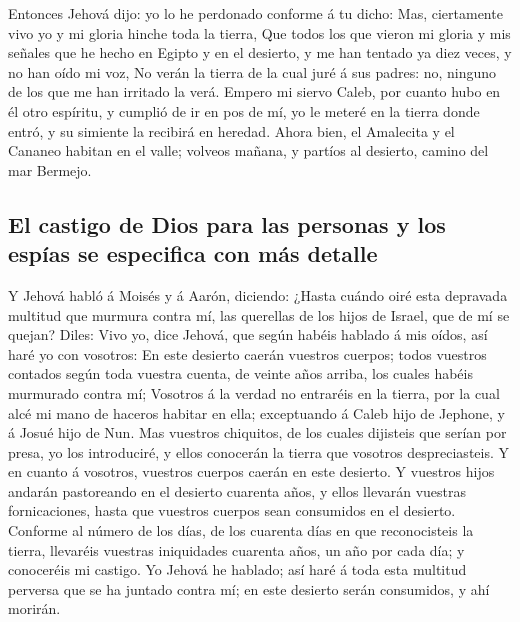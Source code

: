  Entonces Jehová dijo: yo lo he perdonado conforme á tu
dicho:  Mas, ciertamente vivo yo y mi gloria hinche toda la
tierra,  Que todos los que vieron mi gloria y mis señales
que he hecho en Egipto y en el desierto, y me han tentado ya diez veces,
y no han oído mi voz,  No verán la tierra de la cual juré á
sus padres: no, ninguno de los que me han irritado la verá.
 Empero mi siervo Caleb, por cuanto hubo en él otro
espíritu, y cumplió de ir en pos de mí, yo le meteré en la tierra donde
entró, y su simiente la recibirá en heredad.  Ahora bien,
el Amalecita y el Cananeo habitan en el valle; volveos mañana, y partíos
al desierto, camino del mar Bermejo.

\hypertarget{el-castigo-de-dios-para-las-personas-y-los-espuxedas-se-especifica-con-muxe1s-detalle}{%
\subsection{El castigo de Dios para las personas y los espías se
especifica con más
detalle}\label{el-castigo-de-dios-para-las-personas-y-los-espuxedas-se-especifica-con-muxe1s-detalle}}

 Y Jehová habló á Moisés y á Aarón, diciendo: 
¿Hasta cuándo oiré esta depravada multitud que murmura contra mí, las
querellas de los hijos de Israel, que de mí se quejan? 
Diles: Vivo yo, dice Jehová, que según habéis hablado á mis oídos, así
haré yo con vosotros:  En este desierto caerán vuestros
cuerpos; todos vuestros contados según toda vuestra cuenta, de veinte
años arriba, los cuales habéis murmurado contra mí; 
Vosotros á la verdad no entraréis en la tierra, por la cual alcé mi mano
de haceros habitar en ella; exceptuando á Caleb hijo de Jephone, y á
Josué hijo de Nun.  Mas vuestros chiquitos, de los cuales
dijisteis que serían por presa, yo los introduciré, y ellos conocerán la
tierra que vosotros despreciasteis.  Y en cuanto á
vosotros, vuestros cuerpos caerán en este desierto.  Y
vuestros hijos andarán pastoreando en el desierto cuarenta años, y ellos
llevarán vuestras fornicaciones, hasta que vuestros cuerpos sean
consumidos en el desierto.  Conforme al número de los días,
de los cuarenta días en que reconocisteis la tierra, llevaréis vuestras
iniquidades cuarenta años, un año por cada día; y conoceréis mi castigo.
 Yo Jehová he hablado; así haré á toda esta multitud
perversa que se ha juntado contra mí; en este desierto serán consumidos,
y ahí morirán.

